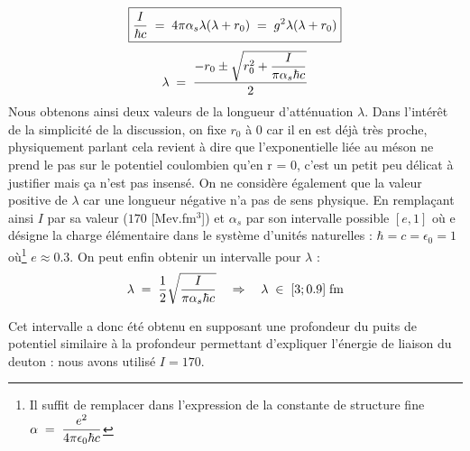 \begin{equation*}
    \boxed{
        \dfrac{I} {\hbar c}\; = \; 4\pi \alpha_s \lambda(\lambda + r_0)
        \; = \; g^2\lambda(\lambda + r_0)}
\end{equation*}
\begin{equation*}
    \lambda \; = \; \dfrac{-r_0 \pm \sqrt{r_0^2 + \dfrac{I}{\pi\alpha_s\hbar c}}}{2}
\end{equation*}
Nous obtenons ainsi deux valeurs de la longueur d'atténuation $\lambda$. Dans l'intérêt de la simplicité de la discussion, on fixe $r_0$ à 0 car il en est déjà très proche, physiquement parlant cela revient à dire que l'exponentielle liée au méson ne prend le pas sur le potentiel coulombien qu'en r = 0, c'est un petit peu délicat à justifier mais ça n'est pas insensé. On ne considère également que la valeur positive de $\lambda$ car une longueur négative n'a pas de sens physique. En remplaçant ainsi $I$ par sa valeur ($170$ [Mev.fm$^3$]) et $\alpha_s$ par son intervalle possible $[e,1]$ où e désigne la charge élémentaire dans le système d'unités naturelles : $\hbar = c = \epsilon_0 = 1$ où\footnote{Il suffit de remplacer dans l'expression de la constante de structure fine $\alpha \; = \; \dfrac{e^2}{4\pi\epsilon_0 \hbar c}$} $e \approx 0.3$. On peut enfin obtenir un intervalle pour $\lambda$ :
\begin{equation*}
    \lambda \; = \; \dfrac{1}{2} \sqrt{\dfrac{I}{\pi\alpha_s\hbar c}}
    \quad \Rightarrow \quad
    \lambda \;\in\; [3;0.9]\; \text{fm}
\end{equation*}

Cet intervalle a donc été obtenu en supposant une profondeur du puits de potentiel similaire à la profondeur permettant d'expliquer l'énergie de liaison du deuton : nous avons utilisé $I=170$.\\

